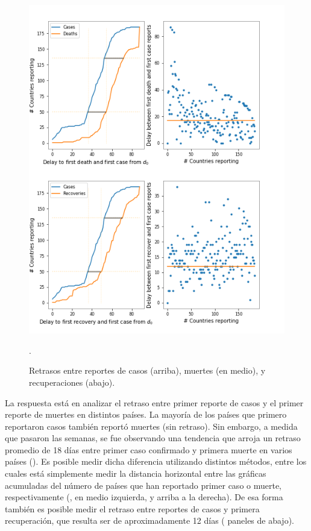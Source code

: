\begin{figure}[h]
\begin{minipage}{0.5\textwidth}
\includegraphics[width=\textwidth]
{figures/tsam_Covid19_JHU_delays_caseDeaths}
\end{minipage}%
\caption{Retrasos entre reportes de casos (arriba), muertes (en medio), y recuperaciones (abajo). }. \label{fig:reportArrivals}
\end{figure}


La respuesta está en analizar el retraso entre primer reporte de casos y el primer reporte de muertes en distintos países. La mayoría de los países que primero reportaron casos también reportó muertes (sin retraso). Sin embargo, a medida que pasaron las semanas, se fue observando una tendencia que arroja un retraso promedio de 18 días entre primer caso confirmado y primera muerte en varios países (). Es posible medir dicha diferencia utilizando distintos métodos, entre los cuales está simplemente medir la distancia horizontal entre las gráficas acumuladas del número de países que han reportado primer caso o muerte, respectivamente (, en medio izquierda, y arriba a la derecha). 
De esa forma también es posible medir el retraso entre reportes de casos y primera recuperación, que resulta ser de aproximadamente 12 días  ( paneles de abajo).

